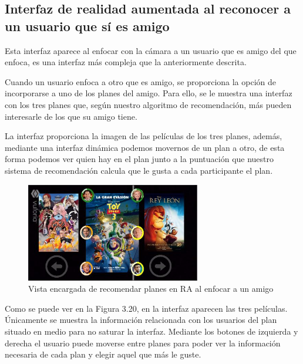 \subsection{Interfaz de realidad aumentada al reconocer a un usuario que sí es amigo}
\label{makereference3.4.5.2}
\begin{flushleft}
Esta interfaz aparece al enfocar con la cámara a un usuario que es amigo del que enfoca, es una interfaz
 más compleja que la anteriormente descrita.
\end{flushleft}
\begin{flushleft}
Cuando un usuario enfoca a otro que es amigo, se proporciona la opción de incorporarse a uno de los planes del
 amigo. Para ello, se le muestra una interfaz con los tres planes que, según nuestro algoritmo de recomendación,
  más pueden interesarle de los que su amigo tiene.
\end{flushleft}
\begin{flushleft}
La interfaz proporciona la imagen de las películas de los tres planes, además, mediante una interfaz dinámica 
podemos movernos de un plan a otro, de esta forma podemos ver quien hay en el plan junto a la puntuación que 
nuestro sistema de recomendación calcula que le gusta a cada participante el plan.
\end{flushleft}
\begin{figure}[H]
        \centering
        \includegraphics[width=3in, angle=270]{figures/chapter-2/recomendadorAR.JPG}
        \caption{Vista encargada de recomendar planes en RA al enfocar a un amigo}
\end{figure}
\begin{flushleft}
Como se puede ver en la Figura 3.20, en la interfaz aparecen las tres películas. Únicamente se muestra la 
información relacionada con los usuarios del plan situado en medio para no saturar la interfaz. Mediante los 
botones de izquierda y derecha el usuario puede moverse entre planes para poder ver la información necesaria 
de cada plan y elegir aquel que más le guste.
\end{flushleft}
